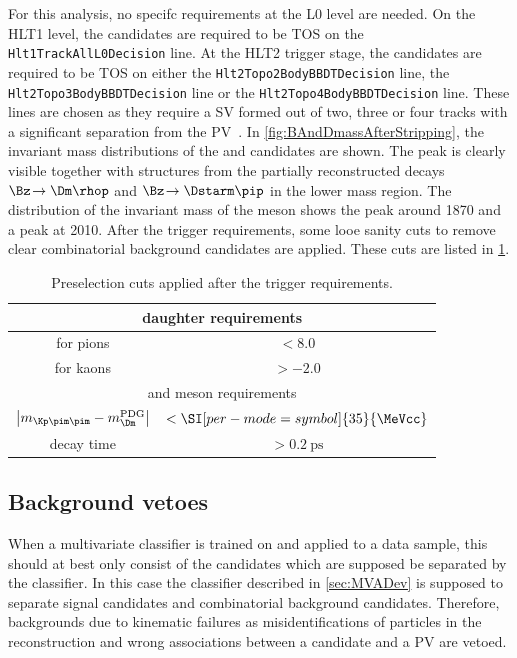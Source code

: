 For this analysis, no specifc requirements at the L0 level are needed.
On the HLT1 level, the \Bz candidates are required to be TOS on the \verb!Hlt1TrackAllL0Decision! line.
At the HLT2 trigger stage, the \BdToDpi candidates are required to be TOS on either the \verb!Hlt2Topo2BodyBBDTDecision! line, the \verb!Hlt2Topo3BodyBBDTDecision! line  or the \verb!Hlt2Topo4BodyBBDTDecision! line.
These lines are chosen as they require a \ac{SV} formed out of two, three or four tracks with a significant separation from the \ac{PV}~\cite{Trigger_Gligorov}.
In \cref{fig:BAndDmassAfterStripping}, the invariant mass distributions of the \Bz and \Dm candidates are shown. The \Bz peak is clearly visible together with structures from the partially reconstructed decays $\Bz\!\to\Dm\rhop$ and $\Bz\!\to\Dstarm\pip$ in the lower mass region.
The distribution of the invariant mass of the \D meson shows the \Dm peak around \SI[per-mode=symbol]{1870}{\MeVcc} and a \Dstarm peak at \SI[per-mode=symbol]{2010}{\MeVcc}.
After the trigger requirements, some looe sanity cuts to remove clear combinatorial background candidates are applied.
These cuts are listed in \cref{tab:preselection}.
\begin{table}[tbp]
	\centering
	\caption{Preselection cuts applied after the trigger requirements.}
	\begin{tabular}{cc}
		\toprule
		\multicolumn{2}{c}{\Dm daughter requirements}\\
		\midrule
		\dllkpi for pions	& $<8.0$ \\
		\dllkpi for kaons 	& $>-2.0$ \\
		\midrule
		\multicolumn{2}{c}{\Dm  and \Bz meson requirements}\\
		\midrule
		$\left|m_{\Kp\pim\pim}-m_\Dm^{\text{PDG}}\right|$	& $<\SI[per-mode=symbol]{35}{\MeVcc}$ \\
		\Bz decay time										& $>\SI{0.2}{\pico\second}$ \\
		\bottomrule
	\end{tabular}
	\label{tab:preselection}
\end{table}

\subsection{Background vetoes}
\label{sec:vetoes}

When a multivariate classifier is trained on and applied to a data sample, this should at best only consist of the candidates which are supposed be separated by the classifier.
In this case the classifier described in \cref{sec:MVADev} is supposed to separate \BdToDpi signal candidates and combinatorial background candidates.
Therefore, backgrounds due to kinematic failures as misidentifications of particles in the reconstruction and wrong associations between a \Bz candidate and a \ac{PV} are vetoed.

